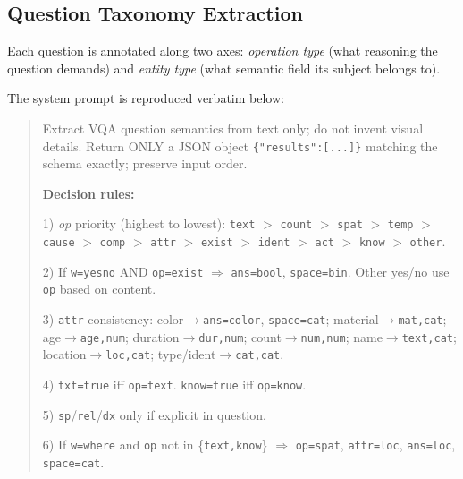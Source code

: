 \documentclass[letterpaper]{article} %
\begin{document}
\subsection{Question Taxonomy Extraction}
\label{app:sem_extraction}\label{app:taxonomy}

Each question is annotated along two axes: \emph{operation type} (what reasoning the question demands) and \emph{entity type} (what semantic field its subject belongs to).

The system prompt is reproduced verbatim below:

\begin{quote}\small
Extract VQA question semantics from text only; do not invent visual details.
Return ONLY a JSON object \texttt{\{"results":[...]\}} matching the schema exactly; preserve input order.

\textbf{Decision rules:}

1) \textit{op} priority (highest to lowest):
\texttt{text} $>$ \texttt{count} $>$ \texttt{spat} $>$ \texttt{temp} $>$ \texttt{cause} $>$ \texttt{comp} $>$ \texttt{attr} $>$ \texttt{exist} $>$ \texttt{ident} $>$ \texttt{act} $>$ \texttt{know} $>$ \texttt{other}.

2) If \texttt{w=yesno} AND \texttt{op=exist} $\Rightarrow$ \texttt{ans=bool}, \texttt{space=bin}. Other yes/no use \texttt{op} based on content.

3) \texttt{attr} consistency: color$\to$\texttt{ans=color}, \texttt{space=cat}; material$\to$\texttt{mat,cat}; age$\to$\texttt{age,num}; duration$\to$\texttt{dur,num}; count$\to$\texttt{num,num}; name$\to$\texttt{text,cat}; location$\to$\texttt{loc,cat}; type/ident$\to$\texttt{cat,cat}.

4) \texttt{txt=true} iff \texttt{op=text}. \texttt{know=true} iff \texttt{op=know}.

5) \texttt{sp}/\texttt{rel}/\texttt{dx} only if explicit in question.

6) If \texttt{w=where} and \texttt{op} not in \{\texttt{text,know}\} $\Rightarrow$ \texttt{op=spat}, \texttt{attr=loc}, \texttt{ans=loc}, \texttt{space=cat}.
\end{quote}


\end{document}
